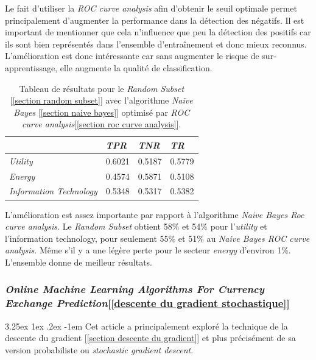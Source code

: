\documentclass[a4paper, 11pt]{article}
\makeatletter
\newcounter{subsubsubsection}[subsubsection]
\renewcommand\paragraph{\@startsection{paragraph}{5}{\z@}%
  {3.25ex \@plus1ex \@minus.2ex}%
  {-1em}%
  {\normalfont\normalsize\bfseries}}
\makeatother
\begin{document}
Le fait d'utiliser la \textit{ROC curve analysis} afin d'obtenir le seuil optimale permet principalement d'augmenter la performance dans la détection des négatifs. Il est important de mentionner que cela n'influence que peu la détection des positifs car ils sont bien représentés dans l'ensemble d'entraînement et donc mieux reconnus. L'amélioration est donc intéressante car sans augmenter le risque de sur-apprentissage, elle augmente la qualité de classification.

\begin{table}[h!]
	\centering
\begin{tabular}{|l|l|l|l|}
	\hline
	\ & \textit{TPR} & \textit{TNR} & \textit{TR}\\
	\hline
	\textit{Utility} & 0.6021 & 0.5187 & 0.5779 \\
	\hline
	\textit{Energy} & 0.4574 & 0.5871 & 0.5108\\
	\hline
	\textit{Information Technology} & 0.5348 & 0.5317 & 0.5382\\
	\hline
\end{tabular}
\caption{Tableau de résultats pour le \textit{Random Subset} [\ref{section random subset}] avec l'algorithme \textit{Naive Bayes} [\ref{section naive bayes}] optimisé par \textit{ROC curve analysis}[\ref{section roc curve analysis}].}
\end{table}

L'amélioration est assez importante par rapport à l'algorithme \textit{Naive Bayes Roc curve analysis}. Le \textit{Random Subset} obtient 58\% et 54\% pour l'\textit{utility} et l'{information technology}, pour seulement 55\% et 51\% au \textit{Naive Bayes ROC curve analysis}. Même s'il y a une légère perte pour le secteur \textit{energy} d'environ 1\%.
L'ensemble donne de meilleur résultats.

\subsubsection{\textit{Online Machine Learning Algorithms For Currency Exchange Prediction}[\ref{descente du gradient stochastique}]}

\paragraph{}
Cet article a principalement exploré la technique de la descente du gradient [\ref{section descente du gradient}] et plus précisément de sa version probabiliste ou \textit{stochastic gradient descent}.
\end{document}
